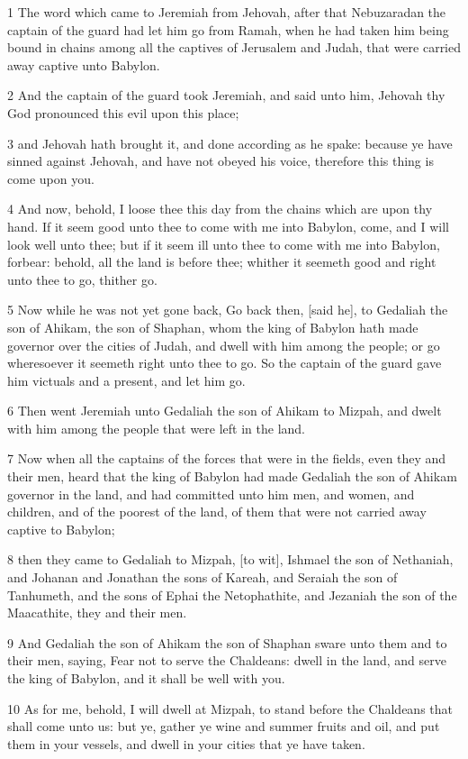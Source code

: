 \par 1 The word which came to Jeremiah from Jehovah, after that Nebuzaradan the captain of the guard had let him go from Ramah, when he had taken him being bound in chains among all the captives of Jerusalem and Judah, that were carried away captive unto Babylon.
\par 2 And the captain of the guard took Jeremiah, and said unto him, Jehovah thy God pronounced this evil upon this place;
\par 3 and Jehovah hath brought it, and done according as he spake: because ye have sinned against Jehovah, and have not obeyed his voice, therefore this thing is come upon you.
\par 4 And now, behold, I loose thee this day from the chains which are upon thy hand. If it seem good unto thee to come with me into Babylon, come, and I will look well unto thee; but if it seem ill unto thee to come with me into Babylon, forbear: behold, all the land is before thee; whither it seemeth good and right unto thee to go, thither go.
\par 5 Now while he was not yet gone back, Go back then, [said he], to Gedaliah the son of Ahikam, the son of Shaphan, whom the king of Babylon hath made governor over the cities of Judah, and dwell with him among the people; or go wheresoever it seemeth right unto thee to go. So the captain of the guard gave him victuals and a present, and let him go.
\par 6 Then went Jeremiah unto Gedaliah the son of Ahikam to Mizpah, and dwelt with him among the people that were left in the land.
\par 7 Now when all the captains of the forces that were in the fields, even they and their men, heard that the king of Babylon had made Gedaliah the son of Ahikam governor in the land, and had committed unto him men, and women, and children, and of the poorest of the land, of them that were not carried away captive to Babylon;
\par 8 then they came to Gedaliah to Mizpah, [to wit], Ishmael the son of Nethaniah, and Johanan and Jonathan the sons of Kareah, and Seraiah the son of Tanhumeth, and the sons of Ephai the Netophathite, and Jezaniah the son of the Maacathite, they and their men.
\par 9 And Gedaliah the son of Ahikam the son of Shaphan sware unto them and to their men, saying, Fear not to serve the Chaldeans: dwell in the land, and serve the king of Babylon, and it shall be well with you.
\par 10 As for me, behold, I will dwell at Mizpah, to stand before the Chaldeans that shall come unto us: but ye, gather ye wine and summer fruits and oil, and put them in your vessels, and dwell in your cities that ye have taken.
